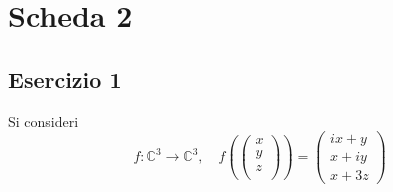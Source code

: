 \documentclass[a4paper]{article}
\theoremstyle{break}
\theoremstyle{break}
\theoremstyle{break}
\theoremstyle{break}
\begin{document}


\tableofcontents
\pagebreak

\section{Scheda 2}
\subsection{Esercizio 1}
Si consideri
\[
	f: \mathbb{C}^3 \to \mathbb{C}^3, \quad f \left( \begin{pmatrix}
			x \\
			y \\
			z \\
		\end{pmatrix}  \right) =
	\begin{pmatrix}
		ix + y \\
		x + iy \\
		x + 3z
	\end{pmatrix}
\]
\end{document}

